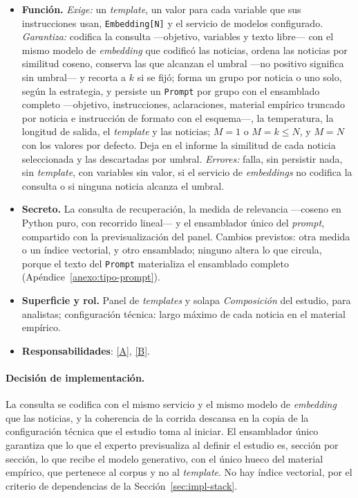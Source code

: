 \documentclass[12pt]{report}
\DeclareRobustCommand{\resp}[1]{\hyperref[tab:registro-responsabilidades]{\textcolor{respcolor}{[#1]}}}
\begin{document}
\begin{itemize}
  \item \textbf{Función.} \textit{Exige:} un \textit{template}, un valor para cada variable que sus instrucciones usan, \texttt{Embedding[N]} y el servicio de modelos configurado. \textit{Garantiza:} codifica la consulta ---objetivo, variables y texto libre--- con el mismo modelo de \textit{embedding} que codificó las noticias, ordena las noticias por similitud coseno, conserva las que alcanzan el umbral ---no positivo significa sin umbral--- y recorta a \(k\) si se fijó; forma un grupo por noticia o uno solo, según la estrategia, y persiste un \texttt{Prompt} por grupo con el ensamblado completo ---objetivo, instrucciones, aclaraciones, material empírico truncado por noticia e instrucción de formato con el esquema---, la temperatura, la longitud de salida, el \textit{template} y las noticias; \(M = 1\) o \(M = k \le N\), y \(M = N\) con los valores por defecto. Deja en el informe la similitud de cada noticia seleccionada y las descartadas por umbral. \textit{Errores:} falla, sin persistir nada, sin \textit{template}, con variables sin valor, si el servicio de \textit{embeddings} no codifica la consulta o si ninguna noticia alcanza el umbral.
  \item \textbf{Secreto.} La consulta de recuperación, la medida de relevancia ---coseno en Python puro, con recorrido lineal--- y el ensamblador único del \textit{prompt}, compartido con la previsualización del panel. Cambios previstos: otra medida o un índice vectorial, y otro ensamblado; ninguno altera lo que circula, porque el texto del \texttt{Prompt} materializa el ensamblado completo (Apéndice~\ref{anexo:tipo-prompt}).
  \item \textbf{Superficie y rol.} Panel de \textit{templates} y solapa \textit{Composición} del estudio, para analistas; configuración técnica: largo máximo de cada noticia en el material empírico.
  \item \textbf{Responsabilidades}: \resp{A}, \resp{B}.
\end{itemize}

\paragraph{Decisión de implementación.} La consulta se codifica con el mismo servicio y el mismo modelo de \textit{embedding} que las noticias, y la coherencia de la corrida descansa en la copia de la configuración técnica que el estudio toma al iniciar. El ensamblador único garantiza que lo que el experto previsualiza al definir el estudio es, sección por sección, lo que recibe el modelo generativo, con el único hueco del material empírico, que pertenece al corpus y no al \textit{template}. No hay índice vectorial, por el criterio de dependencias de la Sección~\ref{sec:impl-stack}.
\end{document}
